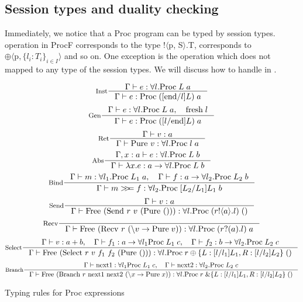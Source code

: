 \subsection{Session types and duality checking} \label{spar:sec:session-typing}
Immediately, we notice that a Proc program can be typed by session types.  operation in ProcF corresponds to the type !$\langle$p, S$\rangle$.T,  corresponds to $\oplus \langle \text{p}, \{ l_i : T_i \}_{i \in I} \rangle$ and so on. One exception is the  operation which does not mapped to any type of the session types. We will discuss how to handle  in . 

\begin{table}[ht]
    \[
        \inference[Inst]{\Gamma \vdash e : \forall l. \text{Proc} \; L \; a}{\Gamma \vdash e : \text{Proc} \; ([\text{end}/l]L) \; a}
    \]
    \[
        \inference[Gen]{\Gamma \vdash e : \forall l. \text{Proc} \; L \; a, \quad \text{fresh} \; l}{\Gamma \vdash e : \text{Proc} \; ([l/\text{end}]L) \; a}
    \]
    \[
        \inference[Ret]{\Gamma |- v : a}{\Gamma |- \text{Pure $v$} : \forall l. \text{Proc} \; l \; a}
    \]
    \[
        \inference[Abs]{\Gamma, x : a |- e : \forall l. \text{Proc} \; L \; b}{\Gamma |- \lambda x. e : a \rightarrow \forall l. \text{Proc} \; L \; b}
    \]
    \[\inference[Bind]{\Gamma |- m : \forall l_1. \Mp{L_1}{a}, \quad \Gamma |- f : a \rightarrow \forall l_2. \Mp{L_2}{b}}{\Gamma |- m >\!\!>\!\!= f : \forall l_2. \Mp{[L_2/L_1]L_1}{b}}\]
    \[\inference[Send]{\Gamma |- v : a}{\Gamma |- \text{Free (Send $r$ $v$ (Pure $()$))} : \forall l. \Mp{(r!\langle a \rangle.l)}{()}}\]
    \[\inference[Recv]{}{\Gamma |- \text{Free (Recv $r$ $(\backslash v -> \text{Pure} \; v)$)} : \forall l. \Mp{(r?(a).l)}{a}}\]
    \[\inference[Select]{\Gamma |- v : a + b, \quad \Gamma |- f_1 : a \rightarrow \forall l_1 \Mp{L_1}{c}, \quad \Gamma |- f_2 : b \rightarrow \forall l_2. \Mp{L_2}{c}}{\Gamma |- \text{Free (Select $r$ $v$ $f_1$ $f_2$ (Pure $()$))} : \forall l. \Mp{r \oplus \{ L : [l/l_1]L_1, R: [l/l_2]L_2\}}{()}}\]
    \[\inference[Branch]{\Gamma |- \text{next1} : \forall l_1 \Mp{L_1}{c}, \quad \Gamma |- \text{next2} : \forall l_2. \Mp{L_2}{c}}{\Gamma |- \text{Free (Branch $r$ next1 next2 ($\backslash x \rightarrow \text{Pure}\; x$))} : \forall l. \Mp{r \; \& \{ L : [l/l_1]L_1, R: [l/l_2]L_2\}}{()}}\]
    \caption{Typing rules for Proc expressions}
    \label{spar:styperule}
\end{table}

